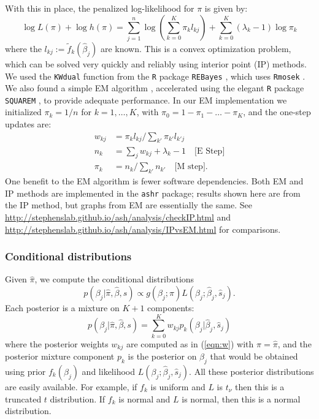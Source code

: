 \documentclass[11pt]{article}
\def\bhat{\hat{\beta}}
\def\shat{\hat{s}}
\begin{document}
With this in place, the penalized log-likelihood for $\pi$ is given by:
\begin{equation}
\log L(\pi) + \log h(\pi) = \sum_{j=1}^n \log(\sum_{k=0}^K \pi_k l_{kj}) + \sum_{k=0}^K (\lambda_k-1) \log \pi_k
\end{equation}
where the $l_{kj}:= \tilde{f}_k(\bhat_j)$ are known. This is a convex optimization problem, which
can be solved very quickly and reliably using interior point (IP) methods. We used the {\tt KWdual} function from the {\tt R} package {\tt REBayes} \cite{REBayes}, which uses {\tt Rmosek} \cite{Rmosek}. We also found a simple EM algorithm \cite{dempster77}, accelerated using the elegant {\tt R} package {\tt SQUAREM} \cite{varadhan2008simple},
to provide adequate performance. In our EM implementation we initialized $\pi_k=1/n$ for $k=1,\dots,K$, with $\pi_0=1-\pi_1-\dots-\pi_K$,
and the one-step updates are:
\begin{align} \label{eqn:w}
w_{kj} & = \pi_k l_{kj} / \sum_{k'} {\pi_{k'} l_{k'j}} \\
n_k & = \sum_j w_{kj} + \lambda_k - 1 \quad \text{[E Step]} \\
\pi_k &= n_k/\sum_{k'} n_{k'} \quad \text{[M step]}.
\end{align}
One benefit to the EM algorithm is fewer software dependencies.
Both EM and IP methods are implemented in the {\tt ashr} package; results shown here are from the IP method, but graphs from EM are essentially the same.
See \url{http://stephenslab.github.io/ash/analysis/checkIP.html}  and \url{http://stephenslab.github.io/ash/analysis/IPvsEM.html}  for comparisons.

\subsubsection*{Conditional distributions}

Given $\hat\pi$, we compute the conditional distributions 
\begin{equation}
p(\beta_j | \hat\pi, \bhat, s) \propto g(\beta_j; \pi) L(\beta_j; \bhat_j, \shat_j).
\end{equation} 
Each posterior is a mixture on $K+1$ components:
\begin{equation}
p(\beta_j | \hat\pi, \bhat, s) = \sum_{k=0}^K w_{kj} p_k(\beta_j | \bhat_j, \shat_j)
\end{equation}
where the posterior weights $w_{kj}$ are computed as in (\ref{eqn:w}) with $\pi=\hat\pi$,
and the posterior mixture component $p_k$ is the posterior on $\beta_j$ that would be obtained using prior 
$f_k(\beta_j)$ and likelihood $L(\beta_j; \bhat_j,\shat_j)$.
All these posterior distributions are easily available.
For example, if $f_k$ is uniform and $L$ is $t_\nu$ then this is a truncated $t$ distribution.
If $f_k$ is normal and $L$ is normal, then this is a normal distribution.
\end{document}
